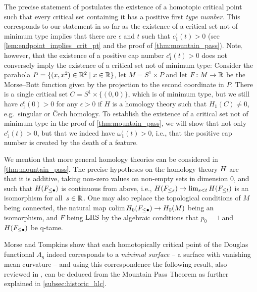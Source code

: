\begin{rem}\label{rem:mountain_pass_conclusion}
	The precise statement of \cite[Corollary 7.1]{Morse.1939} postulates the existence of a homotopic critical point such that every critical set containing it has a positive first \emph{type number}.
	This corresponds to our statement in so far as the existence of a critical set not of minimum type implies that there are $\epsilon$ and $t$ such that $c_{1}^{\epsilon}(t) > 0$ (see \cref{lem:endpoint_implies_crit_pt} and the proof of \cref{thm:mountain_pass}).
	Note, however, that the existence of a positive cap number $c_{1}^{\epsilon}(t) > 0$ does not conversely imply the existence of a critical set not of minimum type:
	Consider the parabola $P = \{(x,x^2) \in \mathbb{R}^2 \mid x \in \mathbb{R}\}$, let $M = S^1 \times P$ and let $F \colon M \to \mathbb{R}$ be the Morse--Bott function given by the projection to the second coordinate in $P$.
	There is a single critical set $C = S^1 \times \{(0,0)\}$, which is of minimum type, but we still have $c_{1}^{\epsilon}(0) > 0$ for any $\epsilon > 0$ if $H$ is a homology theory such that $H_1(C) \neq 0$, e.g.\ singular or \v{C}ech homology.
	To establish the existence of a critical set not of minimum type in the proof of \cref{thm:mountain_pass}, we will show that not only $c_{1}^{\epsilon}(t) > 0$, but that we indeed have $\omega_1^{\epsilon}(t) > 0$, i.e., that the positive cap number is created by the death of a feature.
\end{rem}

\begin{rem}
	We mention that more general homology theories can be considered in \cref{thm:mountain_pass}.
	The precise hypotheses on the homology theory $H$ are that it is additive, taking non-zero values on non-empty sets in dimension $0$, and such that $H(F_{\leq \bullet})$ is continuous from above, i.e., $H(F_{\leq s}) \to \lim_{s < t} H(F_{\leq t})$ is an isomorphism for all~$s \in \mathbb{R}$.
	One may also replace the topological conditions of $M$ being connected, the natural map $\operatorname*{colim} H_0(F_{\leq \bullet}) \to H_0(M)$ being an isomorphism, and $F$ being $\mathrm{LHS}$ by the algebraic conditions that $p_0 = 1$ and $H(F_{\leq \bullet})$ be q-tame.
\end{rem}

Morse and Tompkins show \cite[Theorem 6.2]{Morse.1939} that each homotopically critical point of the Douglas functional $A_g$ indeed corresponds to
%
a \emph{minimal surface} -- a surface with vanishing mean curvature -- and using this correspondence the following result, also reviewed in \cite[Theorem II.6.10]{Struwe.1988}, can be deduced from the Mountain Pass Theorem as further explained in \cref{subsec:historic_hlc}.

